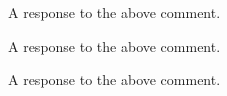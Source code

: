 \documentclass{response}
\begin{document}
\begin{comment}{1}
  I don't want to spoil anything, because the comedy of this movie
  should never be spoiled for anyone.
\end{comment}

\begin{response}
  A response to the above comment.
\end{response}

\begin{comment}{2}
  Just because a critic dislikes a movie, doesn't mean you have to
  dislike it too!
\end{comment}

\begin{response}
  A response to the above comment.
\end{response}

\begin{comment}{3}
  Great directing, great story line, great acting.
\end{comment}

\begin{response}
  A response to the above comment.
\end{response}
\end{document}
